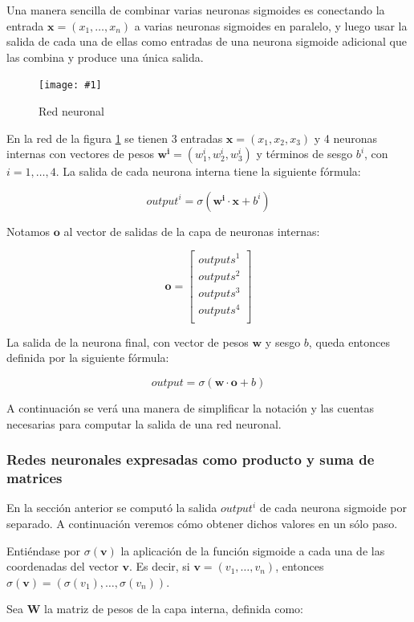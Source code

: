 \documentclass[a4paper, 10pt, twoside]{article}
\newcommand{\img}[3]{
  \begin{figure}[H]
    \begin{center}
      \texttt{[image: \#1]}
    \end{center}
    \caption{#2}
    \label{#3}
  \end{figure}
}
\begin{document}
Una manera sencilla de combinar varias neuronas sigmoides es conectando la
entrada $\bm{x} = (x_1, \ldots, x_n)$ a varias neuronas sigmoides en paralelo,
y luego usar la salida de cada una de ellas como entradas de una neurona
sigmoide adicional que las combina y produce una única salida.

\img{neural-network.png}{Red neuronal}{img:neural-network}

En la red de la figura \ref{img:neural-network} se tienen 3 entradas $\bm{x} =
(x_1, x_2, x_3)$ y 4 neuronas internas con vectores de pesos $\bm{w^i} =
(w^i_1, w^i_2, w^i_3)$ y términos de sesgo $b^i$, con $i = 1, \ldots, 4$. La
salida de cada neurona interna tiene la siguiente fórmula:

$$\mathit{output}^i = \sigma(\bm{w^i} \cdot \bm{x} + b^i)$$

Notamos $\bm{o}$ al vector de salidas de la capa de neuronas internas:

$$
\bm{o} =
\begin{bmatrix}
  \mathit{outputs^1} \\
  \mathit{outputs^2} \\
  \mathit{outputs^3} \\
  \mathit{outputs^4} \\
\end{bmatrix}
$$

La salida de la neurona final, con vector de pesos $\bm{w}$ y sesgo $b$, queda
entonces definida por la siguiente fórmula:

$$\mathit{output} = \sigma(\bm{w} \cdot \bm{o} + b)$$

A continuación se verá una manera de simplificar la notación y las cuentas
necesarias para computar la salida de una red neuronal.


\subsubsection{Redes neuronales expresadas como producto y suma de matrices}

En la sección anterior se computó la salida $\mathit{output}^i$ de cada neurona
sigmoide por separado. A continuación veremos cómo obtener dichos valores en un
sólo paso.

Entiéndase por $\sigma(\bm{v})$ la aplicación de la función sigmoide a cada una
de las coordenadas del vector $\bm{v}$. Es decir, si $\bm{v} = (v_1, \ldots,
v_n)$, entonces  $\sigma(\bm{v}) = (\sigma(v_1), \ldots, \sigma(v_n))$.

Sea $\bm{W}$ la matriz de pesos de la capa interna, definida como:
\end{document}
